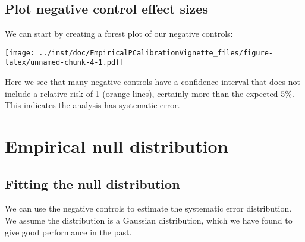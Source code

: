 \documentclass[
]{article}
\newenvironment{Shaded}{\begin{snugshade}}{\end{snugshade}}
\newcommand{\KeywordTok}[1]{\textcolor[rgb]{0.13,0.29,0.53}{\textbf{#1}}}
\newcommand{\NormalTok}[1]{#1}
\newcommand{\OperatorTok}[1]{\textcolor[rgb]{0.81,0.36,0.00}{\textbf{#1}}}
\newcommand{\StringTok}[1]{\textcolor[rgb]{0.31,0.60,0.02}{#1}}
\begin{document}
\hypertarget{plot-negative-control-effect-sizes}{%
\subsection{Plot negative control effect
sizes}\label{plot-negative-control-effect-sizes}}

We can start by creating a forest plot of our negative controls:

\begin{Shaded}
\end{Shaded}

\texttt{[image: ../inst/doc/EmpiricalPCalibrationVignette\_files/figure-latex/unnamed-chunk-4-1.pdf]}

Here we see that many negative controls have a confidence interval that
does not include a relative risk of 1 (orange lines), certainly more
than the expected 5\%. This indicates the analysis has systematic error.

\hypertarget{empirical-null-distribution}{%
\section{Empirical null
distribution}\label{empirical-null-distribution}}

\hypertarget{fitting-the-null-distribution}{%
\subsection{Fitting the null
distribution}\label{fitting-the-null-distribution}}

We can use the negative controls to estimate the systematic error
distribution. We assume the distribution is a Gaussian distribution,
which we have found to give good performance in the past.

\begin{Shaded}
\end{Shaded}
\end{document}
